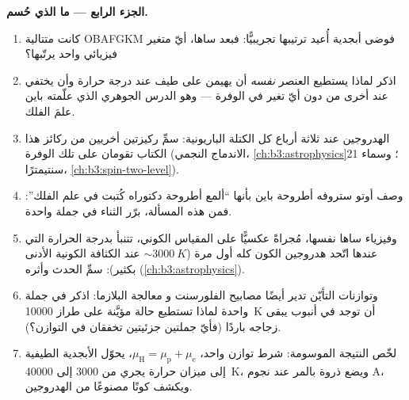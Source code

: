\begin{problem}
\medskip\noindent\textbf{الجزء الرابع --- ما الذي حُسم.}
\begin{enumerate}[resume]
  \item كانت متتالية OBAFGKM فوضى أبجدية أُعيد
        ترتيبها تجريبيًّا: فبعد ساها، أيّ متغير فيزيائي
        واحد يرتّبها؟
  \item اذكر لماذا يستطيع العنصر \emph{نفسه} أن يهيمن على
        طيف عند درجة حرارة وأن يختفي عند أخرى من دون
        أيّ تغير في الوفرة --- وهو الدرس الجوهري الذي علّمته باين
        علمَ الفلك.
  \item الهدروجين عند ثلاثة أرباع كل الكتلة الباريونية: سمِّ
        ركيزتين أخريين من ركائز هذا الكتاب تقومان على تلك الوفرة
        (الاندماج النجمي، \cref{ch:b3:astrophysics}؛ وسماء
        21 سنتيمترًا، \cref{ch:b3:spin-two-level}).
  \item وصف أوتو ستروفه أطروحة باين بأنها ``ألمع
        أطروحة دكتوراه كُتبت في علم الفلك'': فمن هذه
        المسألة، برّر الثناء في جملة واحدة.
  \item وفيزياء ساها نفسها، مُجراةً عكسيًّا على المقياس الكوني،
        تتنبأ بدرجة الحرارة التي عندها اتّحد هدروجين الكون
        كله أول مرة ($\sim\qty{3000}{K}$ عند الكثافة الكونية
        الأدنى بكثير): سمِّ الحدث وأثره
        (\cref{ch:b3:astrophysics}).
  \item وتوازنات التأيّن تدير أيضًا مصابيح الفلورسنت و
        معالجة البلازما: اذكر في جملة واحدة لماذا تستطيع
        حالة مؤيَّنة على طراز \qty{10000}{K} أن توجد في أنبوب
        يبقى زجاجه باردًا (فأيّ جملتين جزئيتين تخفقان في التوازن؟).
  \item لخّص النتيجة الموسومة: شرط توازن واحد،
        $\mu_{\text{H}} = \mu_{\text{p}} + \mu_{\text{e}}$، يحوّل
        الأبجدية الطيفية إلى ميزان حرارة يجري من
        $3000$ إلى \qty{40000}{K}، ويضع ذروة بالمر عند نجوم
        A، ويكشف كونًا مصنوعًا من الهدروجين.
\end{enumerate}
\end{problem}
